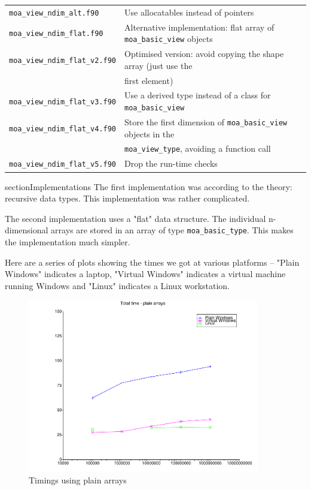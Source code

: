\documentclass[onecolumn]{article}
\begin{document}
\begin{table}
\begin{tabular}{ll}
\verb+moa_view_ndim_alt.f90+     & Use allocatables instead of pointers                                    \\
\verb+moa_view_ndim_flat.f90+    & Alternative implementation: flat array of \verb+moa_basic_view+ objects \\
\verb+moa_view_ndim_flat_v2.f90+ & Optimised version: avoid copying the shape array (just use the          \\
                                 & first element)                                                          \\
\verb+moa_view_ndim_flat_v3.f90+ & Use a derived type instead of a class for \verb+moa_basic_view+         \\
\verb+moa_view_ndim_flat_v4.f90+ & Store the first dimension of \verb+moa_basic_view+ objects in the       \\
                                 & \verb+moa_view_type+, avoiding a function call                          \\
\verb+moa_view_ndim_flat_v5.f90+ & Drop the run-time checks                                                \\


\end{tabular}
\end{table}

section{Implementations}
The first implementation was according to the theory: recursive data types. This implementation was
rather complicated.

The second implementation uses a "flat" data structure. The individual n-dimensional arrays are stored in an
array of type \verb+moa_basic_type+. This makes the implementation much simpler.

Here are a series of plots showing the times we got at various platforms -- "Plain Windows" indicates a laptop,
"Virtual Windows" indicates a virtual machine running Windows and "Linux" indicates a Linux workstation.

\begin{figure}
\includegraphics[width=0.9\textwidth]{total_array.pdf}
\caption{Timings using plain arrays}
\end{figure}
\end{document}
